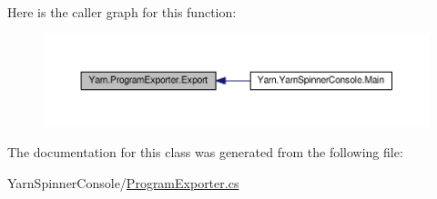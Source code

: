 Here is the caller graph for this function\-:
\nopagebreak
\begin{figure}[H]
\begin{center}
\leavevmode
\includegraphics[width=350pt]{a00155_a3679a1f144471ea411fed34f6a79a18d_icgraph}
\end{center}
\end{figure}




The documentation for this class was generated from the following file\-:\begin{DoxyCompactItemize}
\item 
Yarn\-Spinner\-Console/\hyperlink{a00329}{Program\-Exporter.\-cs}\end{DoxyCompactItemize}
